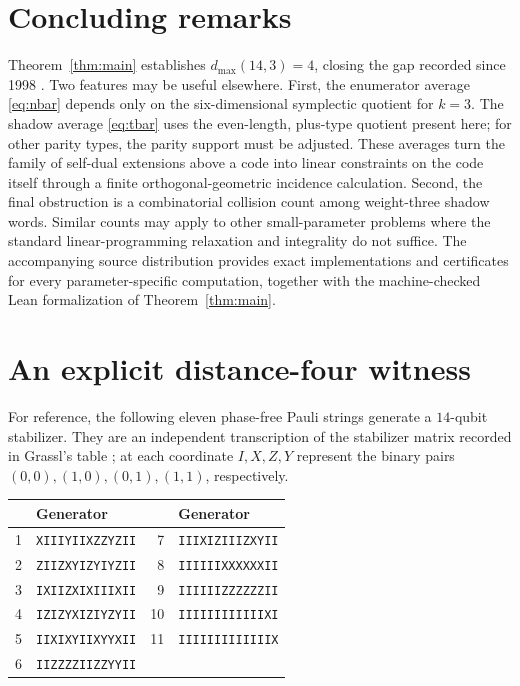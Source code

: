 \documentclass[11pt]{amsart}
\theoremstyle{definition}
\theoremstyle{remark}
\begin{document}
\section{Concluding remarks}\label{sec:remarks}

Theorem~\ref{thm:main} establishes $d_{\max}(14,3)=4$, closing the gap
recorded since 1998 \cite{CRSS1998,Grassl}.  Two features may be useful elsewhere.
First, the enumerator average \eqref{eq:nbar} depends only on the
six-dimensional symplectic quotient for $k=3$.  The shadow average
\eqref{eq:tbar} uses the even-length, plus-type quotient present here; for
other parity types, the parity support must be adjusted.  These averages turn
the family of self-dual extensions above a code into linear constraints on
the code itself through a finite orthogonal-geometric incidence calculation.
Second, the final obstruction is a combinatorial collision count among
weight-three shadow words.  Similar counts may apply to other small-parameter
problems where the standard linear-programming relaxation and integrality do
not suffice.  The accompanying source distribution provides exact
implementations and certificates for every parameter-specific computation,
together with the machine-checked Lean formalization of
Theorem~\ref{thm:main}.

\appendix
\section{An explicit distance-four witness}\label{app:witness}

For reference, the following eleven phase-free Pauli strings generate a
$14$-qubit stabilizer.  They are an independent transcription of the
stabilizer matrix recorded in Grassl's table \cite{Grassl}; at each coordinate
$I,X,Z,Y$ represent the binary pairs $(0,0),(1,0),(0,1),(1,1)$, respectively.

\begin{center}
\small
\begin{tabular}{@{}r@{\quad}l@{\qquad}r@{\quad}l@{}}
\toprule
 & Generator & & Generator \\
\midrule
1  & \texttt{XIIIYIIXZZYZII} & 7  & \texttt{IIIXIZIIIZXYII} \\
2  & \texttt{ZIIZXYIZYIYZII} & 8  & \texttt{IIIIIIXXXXXXII} \\
3  & \texttt{IXIIZXIXIIIXII} & 9  & \texttt{IIIIIIZZZZZZII} \\
4  & \texttt{IZIZYXIZIYZYII} & 10 & \texttt{IIIIIIIIIIIIXI} \\
5  & \texttt{IIXIXYIIXYYXII} & 11 & \texttt{IIIIIIIIIIIIIX} \\
6  & \texttt{IIZZZZIIZZYYII} &    & \\
\bottomrule
\end{tabular}
\end{center}
\end{document}
